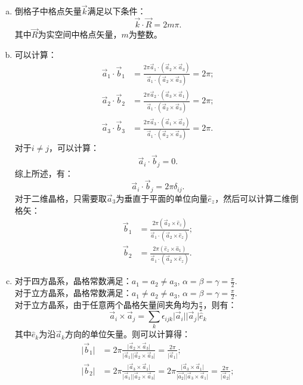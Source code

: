 \documentclass[reqno,a4paper,12pt]{amsart}
\begin{document}
\begin{tcolorbox}[breakable, colback = black!5!white, colframe = black]
\begin{enumerate}[(a)]
\item 倒格子中格点矢量$\vec{k}$满足以下条件：
\[
	\vec{k} \cdot \vec{R} = 2m\pi.
\]
其中$\vec{R}$为实空间中格点矢量，$m$为整数。 \\
\item 可以计算：
\begin{align*}
	\vec{a}_1 \cdot \vec{b}_1 &= \frac{2\pi \vec{a}_1 \cdot (\vec{a}_2\times\vec{a}_3)}{\vec{a}_1 \cdot (\vec{a}_2\times\vec{a}_3)} = 2\pi; \\
	\vec{a}_2 \cdot \vec{b}_2 &= \frac{2\pi \vec{a}_2 \cdot (\vec{a}_3\times\vec{a}_1)}{\vec{a}_1 \cdot (\vec{a}_2\times\vec{a}_3)} = 2\pi; \\
	\vec{a}_3 \cdot \vec{b}_3 &= \frac{2\pi \vec{a}_3 \cdot (\vec{a}_1\times\vec{a}_2)}{\vec{a}_1 \cdot (\vec{a}_2\times\vec{a}_3)} = 2\pi.
\end{align*}
对于$i\neq j$，可以计算：
\[
	\vec{a}_i \cdot \vec{b}_j = 0.
\]
综上所述，有：
\[
	\vec{a}_i \cdot \vec{b}_j = 2\pi \delta_{ij}.
\]
对于二维晶格，只需要取$\vec{a}_3$为垂直于平面的单位向量$\hat{e}_z$，然后可以计算二维倒格矢：
\begin{align*}
	\vec{b}_1 &= \frac{2\pi(\vec{a}_2 \times \hat{e}_z)}{\vec{a}_1\cdot (\vec{a}_2 \times \hat{e}_z)}; \\
	\vec{b}_2 &= \frac{2\pi(\hat{e}_z \times \hat{a}_1)}{\vec{a}_1\cdot (\vec{a}_2 \times \hat{e}_z)}.
\end{align*}
\item 对于四方晶系，晶格常数满足：$a_1 = a_2 \neq a_3$, $\alpha = \beta = \gamma = \frac{\pi}{2}$. \\
对于立方晶系，晶格常数满足：$a_1 \neq a_2 \neq a_3$, $\alpha = \beta = \gamma = \frac{\pi}{2}$. \\
对于立方晶系，由于任意两个晶格矢量间夹角均为$\frac{\pi}{2}$，则有：
\[
	\vec{a}_i \times \vec{a}_j = \sum_k\epsilon_{ijk} \vert \vec{a}_i \vert \vert \vec{a}_j \vert \hat{e}_k
\]
其中$\hat{e}_k$为沿$\vec{a}_k$方向的单位矢量。则可以计算得：
\begin{align*}
	\vert \vec{b}_1 \vert &= 2\pi \frac{\vert \vec{a}_2\times\vec{a}_3 \vert}{\vert \vec{a}_1 \vert \vert \vec{a}_2\times\vec{a}_3 \vert} = \frac{2\pi}{\vert \vec{a}_1 \vert}; \\
	\vert \vec{b}_2 \vert &= 2\pi \frac{\vert \vec{a}_3\times\vec{a}_1 \vert}{\vert \vec{a}_1 \vert \vert \vec{a}_2\times\vec{a}_3 \vert} = 2\pi\frac{\vert \vec{a}_3\times\vec{a}_1 \vert}{\vert \vec{a_2} \vert \vert \vec{a}_3 \times \vec{a}_1 \vert} = \frac{2\pi}{\vert \vec{a}_2 \vert}; \\

\end{align*}
\end{enumerate}
\end{tcolorbox}
\end{document}
